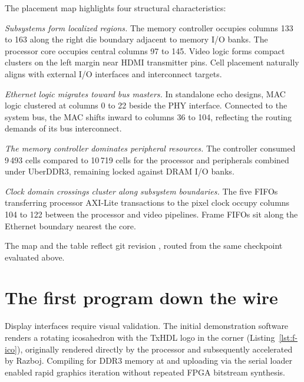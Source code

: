 \documentclass[journal,9pt]{IEEEtran}
\begin{document}
\begin{table}[t]
\caption{The same placement as numbers. A slice holds several cells,
so these counts are larger than a utilisation report's, which counts
slices.}
\label{tab:f-place}
\centering
\footnotesize

\end{table}

The placement map highlights four structural characteristics:

\emph{Subsystems form localized regions.} The memory controller occupies columns
133 to 163 along the right die boundary adjacent to memory I/O banks. The
processor core occupies central columns 97 to 145. Video logic forms compact
clusters on the left margin near HDMI transmitter pins. Cell placement
naturally aligns with external I/O interfaces and interconnect targets.

\emph{Ethernet logic migrates toward bus masters.} In standalone echo designs,
MAC logic clustered at columns 0 to 22 beside the PHY interface. Connected to
the system bus, the MAC shifts inward to columns 36 to 104, reflecting the
routing demands of its bus interconnect.

\emph{The memory controller dominates peripheral resources.} The controller
consumed 9\,493 cells compared to 10\,719 cells for the processor and
peripherals combined under UberDDR3, remaining locked against DRAM I/O banks.

\emph{Clock domain crossings cluster along subsystem boundaries.} The five FIFOs
transferring processor AXI-Lite transactions to the pixel clock occupy columns
104 to 122 between the processor and video pipelines. Frame FIFOs sit along the
Ethernet boundary nearest the core.

The map and the table reflect git revision , routed from the same
checkpoint evaluated above.

\section{The first program down the wire}
\label{sec:f-first}

Display interfaces require visual validation. The initial demonstration software
renders a rotating icosahedron with the TxHDL logo in the corner
(Listing~\ref{lst:f-ico}), originally rendered directly by the processor and
subsequently accelerated by Razboj. Compiling for DDR3 memory at
 and uploading via the serial loader enabled rapid graphics
iteration without repeated FPGA bitstream synthesis.
\end{document}
